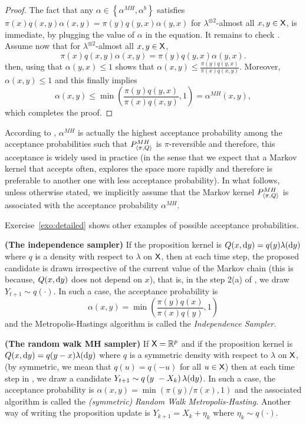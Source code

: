 \documentclass[english,graybox,envcountchap,envcountsame,sectrefs,shortlabels]{svmono}
\theoremstyle{style}
\begin{document}
\begin{proof}
The fact that any $\alpha\in\left\{ \alpha^{MH},\alpha^{b}\right\} $
satisfies $\pi(x)q(x,y)\alpha(x,y)=\pi(y)q(y,x)\alpha(y,x)$ for $\lambda^{\otimes2}$-almost
all $x,y\in\mathsf{X}$, is immediate, by plugging the value of $\alpha$ in the equation.
It remains to check . Assume now that for $\lambda^{\otimes2}$-almost
all $x,y\in\mathsf{X}$,
\[
\pi(x)q(x,y)\alpha(x,y)=\pi(y)q(y,x)\alpha(y,x).
\]
then, using that $\alpha(y,x)\leq1$ shows that $\alpha(x,y)\leq\frac{\pi(y)q(y,x)}{\pi(x)q(x,y)}$.
Moreover, $\alpha(x,y)\leq1$ and this finally implies
\[
\alpha(x,y)\leq\min\left(\frac{\pi(y)q(y,x)}{\pi(x)q(x,y)},1\right)=\alpha^{MH}(x,y),
\]
which completes the proof.
\end{proof}

According to , $\alpha^{MH}$ is actually the highest
acceptance probability among the acceptance probabilities such that
$P_{\langle\pi,Q\rangle}^{MH}$ is $\pi$-reversible and therefore, this acceptance
is widely used in practice (in the sense that we expect that a Markov
kernel that accepts often, explores the space more rapidly and therefore
is preferable to another one with less acceptance probability). In
what follows, unless otherwise stated, we implicitly
assume that the Markov kernel $P_{\langle\pi,Q\rangle}^{MH}$ is associated with the acceptance
probability $\alpha^{MH}$.

Exercise~\ref{exo:detailed} shows other examples of possible acceptance probabilities.


\begin{example}
\textbf{(The independence sampler)} If the proposition kernel is $Q(x,\mathrm{d} y)=q(y)\lambda(\mathrm{d} y)$
where $q$ is a density with respect to $\lambda$ on $\mathsf{X}$, then at each time
step, the proposed candidate is drawn irrespective of the current
value of the Markov chain (this is because, $Q(x,\mathrm{d} y)$ does not
depend on $x$), that is, in the step 2(a) of , we draw
$Y_{t+1}\sim q\left(\cdot\right)$. In such  a case, the acceptance probability
is 
$$
\alpha(x,y)=\min\left(\frac{\pi(y)q(x)}{\pi(x)q(y)},1\right)
$$
and the Metropolis-Hastings algorithm is called the \emph{Independence
Sampler. }
\end{example}

\begin{example}
\textbf{(The random walk MH sampler)}  If $\mathsf{X}=\mathbb{R}^{p}$ and if
the proposition kernel is $Q(x,\mathrm{d} y)=q(y-x)\lambda(\mathrm{d} y)$ where
$q$ is a symmetric density with respect to $\lambda$ on $\mathsf{X}$, (by symmetric,
we mean that $q(u)=q(-u)$ for all $u\in\mathsf{X}$) then at each time
step in , we draw a candidate $Y_{t+1}\sim q\left(y\ -X_{k}\right)\lambda(\mathrm{d} y)$.
In such a case, the acceptance probability is $\alpha(x,y)=\min\left(\pi(y)/\pi(x),1\right)$
and the associated algorithm is called the \emph{(symmetric)} \emph{Random
Walk Metropolis-Hasting.}\textbf{ }Another way of writing the proposition
update is $Y_{k+1}=X_{k}+\eta_{k}$ where $\eta_{k}\sim q(\cdot)$.\textbf{ }
\end{example}
\end{document}
